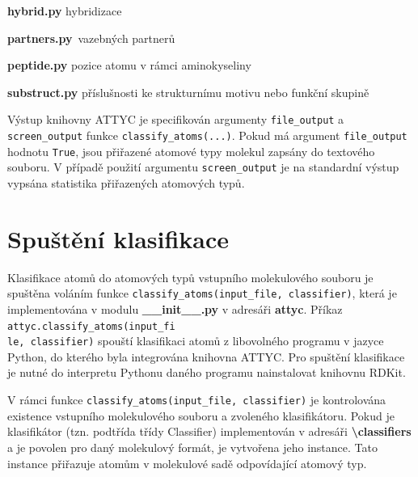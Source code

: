 \vspace{0.01cm}
\textbf{hybrid.py} hybridizace

\vspace{0.01cm}
\textbf{partners.py}\ vazebných partnerů

\vspace{0.01cm}
\textbf{peptide.py} pozice atomu v rámci aminokyseliny
    
\vspace{0.01cm}
\textbf{substruct.py} příslušnosti ke strukturnímu motivu nebo funkční skupině

\bigskip
Výstup knihovny ATTYC je specifikován argumenty \verb|file_output| a \verb|screen_output| funkce \verb|classify_atoms(...)|. Pokud má argument \verb|file_output| hodnotu \verb|True|, jsou přiřazené atomové typy molekul zapsány do textového souboru. V případě použití argumentu \verb|screen_output| je na standardní výstup vypsána statistika přiřazených atomových typů.


\section{Spuštění klasifikace}
Klasifikace atomů do atomových typů vstupního molekulového souboru je spuštěna voláním fun\-kce \verb|classify_atoms(input_file, classifier)|, která je 
implementována v modulu \textbf{\_\_init\_\_.py} v adresáři \textbf{attyc}. Příkaz \verb|attyc.classify_atoms(input_fi|\\ \verb|le, classifier)| spouští klasifikaci atomů z libovolného programu v jazyce Python, do kterého byla integrována knihovna ATTYC. Pro spuštění klasifikace je nutné do interpretu Pythonu daného programu nainstalovat knihovnu RDKit. 

V rámci funkce \verb|classify_atoms(input_file, classifier)| je kontrolována e\-xistence vstupního molekulového souboru a zvoleného klasifikátoru. Pokud je klasifikátor (tzn. podtřída třídy Classifier) implementován v adresáři \textbf{\textbackslash classifiers} a je povolen pro daný molekulový formát, je vytvořena jeho instance. Tato instance přiřazuje atomům v molekulové sadě odpovídající atomový typ.


